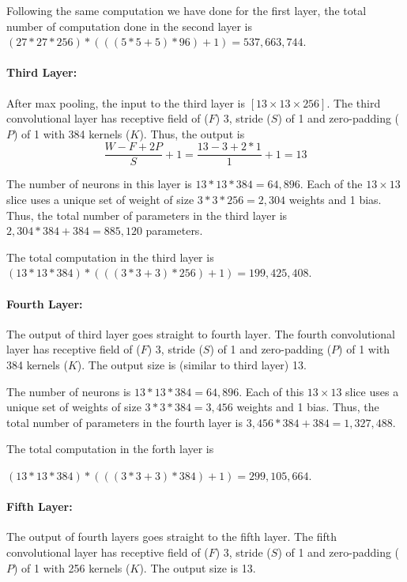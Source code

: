 \documentclass[12pt] {article}
\begin{document}
Following the same computation we have done for the first layer, the total number of computation done in the second layer is $(27*27*256)* \left( \left( (5*5+5)*96 \right) +1 \right) = 537,663,744$.

\paragraph{Third Layer:} After max pooling, the input to the third layer is $[13 \times 13 \times 256]$. The third convolutional layer has receptive field of ($F$) 3, stride ($S$) of 1 and zero-padding ($P$) of 1 with 384 kernels ($K$). Thus, the output is
$$
\frac{W-F+2P}{S} + 1 = \frac{13-3+2*1}{1} + 1 = 13
$$

The  number of neurons in this layer is $13*13*384 = 64,896$. Each of the $13 \times 13$ slice uses a unique set of weight of size $3*3*256 =2,304$ weights and 1 bias. Thus, the total number of parameters in the third layer is $2,304*384 + 384 = 885,120$ parameters. 

The total computation in the third layer is $(13*13*384)*\left(  \left( (3*3+3)*256 \right)+1 \right) = 199,425,408$. 

\paragraph{Fourth Layer:} The output of third layer goes straight to fourth layer. The fourth convolutional layer has receptive field of ($F$) 3, stride ($S$) of 1 and zero-padding ($P$) of 1 with 384 kernels ($K$). The output size is (similar to third layer) 13.

The number of neurons is $13*13*384 = 64,896$. Each of this $13 \times 13$ slice uses a unique set of weights of size $3*3*384=3,456$ weights and 1 bias. Thus, the total number of parameters in the fourth layer is $3,456*384 + 384 =1,327,488$.

The total computation in the forth layer is 

$(13*13*384)*\left(  \left( (3*3+3)*384 \right)+1 \right) = 299,105,664$. 

\paragraph{Fifth Layer:} The output of fourth layers goes straight to the fifth layer. The fifth convolutional layer has receptive field of ($F$) 3, stride ($S$) of 1 and zero-padding ($P$) of 1 with 256 kernels ($K$). The output size is 13.
\end{document}
